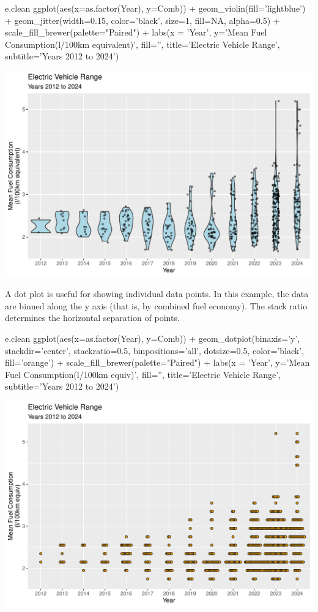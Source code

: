 \begin{samepage}
\begin{Rcode}
e.clean %
  ggplot(aes(x=as.factor(Year), y=Comb)) +
    geom_violin(fill='lightblue') +
    geom_jitter(width=0.15, color='black', 
                size=1, fill=NA, alpha=0.5) + 
    scale_fill_brewer(palette="Paired") +
    labs(x = 'Year', 
         y='Mean Fuel Consumption\n(l/100km equivalent)', 
         fill='', 
         title='Electric Vehicle Range', 
         subtitle='Years 2012 to 2024')
\end{Rcode}
\end{samepage}

\begin{center}
  \includegraphics[width=.8\textwidth]{fuel.violin.pdf}
\end{center}

A dot plot is useful for showing individual data points. In this example, the data are binned along the y axis (that is, by combined fuel economy). The stack ratio determines the horizontal separation of points.

\begin{Rcode}
e.clean %
  ggplot(aes(x=as.factor(Year), y=Comb)) +
    geom_dotplot(binaxis='y', 
                 stackdir='center', 
                 stackratio=0.5,
                 binpositions='all',
                 dotsize=0.5, 
                 color='black', 
                 fill='orange') +
    scale_fill_brewer(palette="Paired") +
    labs(x = 'Year', 
         y='Mean Fuel Consumption\n(l/100km equiv)', 
         fill='', 
         title='Electric Vehicle Range', 
         subtitle='Years 2012 to 2024')
\end{Rcode}

\begin{center}
  \includegraphics[width=.8\textwidth]{fuel.dotplot.pdf}
\end{center}

